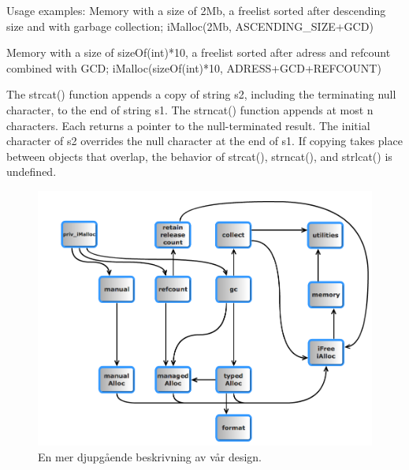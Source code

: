\documentclass{article}
\begin{document}
  Usage examples:
  Memory with a size of 2Mb, a freelist sorted after descending size and with garbage collection;
  iMalloc(2Mb, ASCENDING_SIZE+GCD)

  Memory with a size of sizeOf(int)*10, a freelist sorted after adress and refcount combined with GCD;
  iMalloc(sizeOf(int)*10, ADRESS+GCD+REFCOUNT)

  


    The strcat() function appends a copy of string s2, including
     the terminating null character, to the end of string s1. The
     strncat()  function  appends  at  most  n  characters.  Each
     returns a pointer to the null-terminated result. The initial
     character of  s2 overrides the null character at the end  of
     s1. If copying takes place between objects that overlap, the
     behavior of strcat(), strncat(), and strlcat() is undefined.




\begin{figure}[H]
  \includegraphics[width=\columnwidth]{../bilder/design_depth.png}
  \caption{En mer djupgående beskrivning av vår design.}
  \label{fig:stable}
\end{figure}
\end{document}
